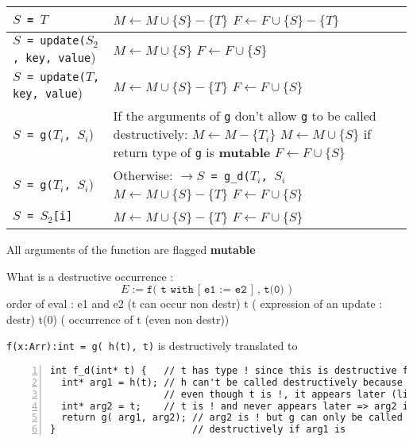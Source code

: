 \documentclass[12pt,a4paper]{article}
\newcommand{\cl}[1]{\texttt{#1}}
\newcommand{\mut}{  \textbf{ mutable } }
\begin{document}
\begin{tabular}{|p{60mm}|p{90mm}|}
\hline
\cl{$S$ = $T$} & $M \leftarrow M \cup \{ S \} - \{T\}$ \newline $F \leftarrow F \cup \{ S \} - \{T\}$  \\ \hline
\cl{$S$ = update($S_2$, key, value}) & $M \leftarrow M \cup \{ S \}$ \newline $F \leftarrow F \cup \{ S \}$ \\ \hline
\cl{$S$ = update($T$, key, value}) & $M \leftarrow M \cup \{ S \}  - \{T\}$ \newline $F \leftarrow F \cup \{ S \}$ \\ \hline

\cl{$S$ = g($T_i$, $S_i$}) & If the arguments of \cl{g} don't allow \cl{g} to be called destructively: \newline $M \leftarrow M - \{T_i \}$ \newline $M \leftarrow M \cup \{ S \}$ if return type of \cl{g} is \mut \newline $F \leftarrow F \cup \{ S\}$ \\ \hline

\cl{$S$ = g($T_i$, $S_i$}) & Otherwise: \newline \cl{$\rightarrow S$ = g\_d($T_i$, $S_i$} \newline $M \leftarrow M \cup \{ S \}  - \{T\}$ \newline $F \leftarrow F \cup \{ S \}$ \\ \hline

\cl{$S$ = $S_2$[i]} & $M \leftarrow M \cup \{ S \}  - \{T\}$ \newline $F \leftarrow F \cup \{ S \}$ \\ \hline


\end{tabular}




All arguments of the function are flagged \mut 




What is a destructive occurrence :
$$ E :=  \cl{f(  t with [ e1 := e2 ] , t(0) )} $$
order of eval :
e1 and e2  (t can occur non destr)
t          ( expression of an update : destr)
t(0)       ( occurrence of t (even non destr))

\cl{f(x:Arr):int = g( h(t), t)}  is destructively translated to \\
\begin{lstlisting}[numbers=left,caption=Example]
int f_d(int* t) {   // t has type ! since this is destructive f
  int* arg1 = h(t); // h can't be called destructively because
                    // even though t is !, it appears later (line 4)
  int* arg2 = t;    // t is ! and never appears later => arg2 is !
  return g( arg1, arg2); // arg2 is ! but g can only be called
}                        // destructively if arg1 is
\end{lstlisting}
\end{document}

